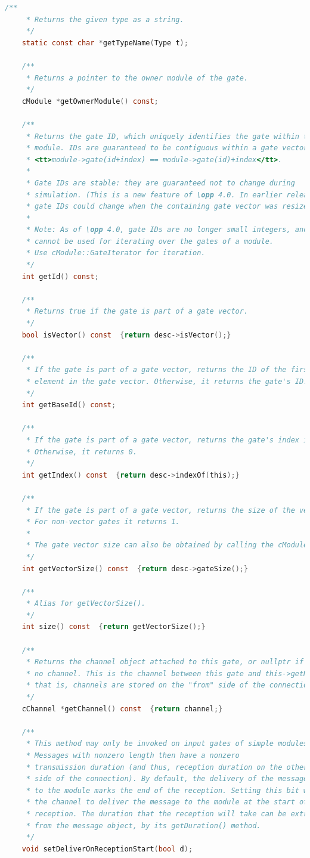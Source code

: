 \begin{lstlisting}[language=c]
    /**
     * Returns the given type as a string.
     */
    static const char *getTypeName(Type t);

    /**
     * Returns a pointer to the owner module of the gate.
     */
    cModule *getOwnerModule() const;

    /**
     * Returns the gate ID, which uniquely identifies the gate within the
     * module. IDs are guaranteed to be contiguous within a gate vector:
     * <tt>module->gate(id+index) == module->gate(id)+index</tt>.
     *
     * Gate IDs are stable: they are guaranteed not to change during
     * simulation. (This is a new feature of \opp 4.0. In earlier releases,
     * gate IDs could change when the containing gate vector was resized.)
     *
     * Note: As of \opp 4.0, gate IDs are no longer small integers, and
     * cannot be used for iterating over the gates of a module.
     * Use cModule::GateIterator for iteration.
     */
    int getId() const;

    /**
     * Returns true if the gate is part of a gate vector.
     */
    bool isVector() const  {return desc->isVector();}

    /**
     * If the gate is part of a gate vector, returns the ID of the first
     * element in the gate vector. Otherwise, it returns the gate's ID.
     */
    int getBaseId() const;

    /**
     * If the gate is part of a gate vector, returns the gate's index in the vector.
     * Otherwise, it returns 0.
     */
    int getIndex() const  {return desc->indexOf(this);}

    /**
     * If the gate is part of a gate vector, returns the size of the vector.
     * For non-vector gates it returns 1.
     *
     * The gate vector size can also be obtained by calling the cModule::gateSize().
     */
    int getVectorSize() const  {return desc->gateSize();}

    /**
     * Alias for getVectorSize().
     */
    int size() const  {return getVectorSize();}

    /**
     * Returns the channel object attached to this gate, or nullptr if there is
     * no channel. This is the channel between this gate and this->getNextGate(),
     * that is, channels are stored on the "from" side of the connections.
     */
    cChannel *getChannel() const  {return channel;}

    /**
     * This method may only be invoked on input gates of simple modules.
     * Messages with nonzero length then have a nonzero
     * transmission duration (and thus, reception duration on the other
     * side of the connection). By default, the delivery of the message
     * to the module marks the end of the reception. Setting this bit will cause
     * the channel to deliver the message to the module at the start of the
     * reception. The duration that the reception will take can be extracted
     * from the message object, by its getDuration() method.
     */
    void setDeliverOnReceptionStart(bool d);


\end{lstlisting}
